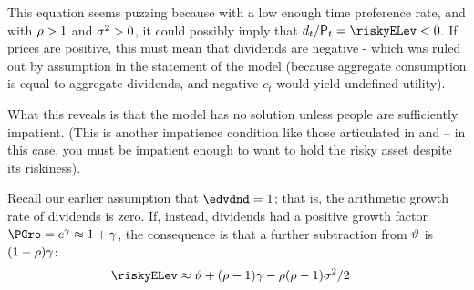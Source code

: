 \documentclass{\handout}
\begin{document}
  This equation seems puzzing because with a low enough time preference rate, and with $\rho > 1$ and $\sigma^{2} > 0$, it could possibly imply that $\dvdnd_{t}/\Price_{t} = \riskyELev < 0$.  If prices are positive, this must mean that dividends are negative - which was ruled out by assumption in the statement of the model (because aggregate consumption is equal to aggregate dividends, and negative $c_{t}$ would yield undefined utility).

  What this reveals is that the model has no solution unless people are sufficiently impatient.  (This is another impatience condition like those articulated in  and  -- in this case, you must be impatient enough to want to hold the risky asset despite its riskiness).
  
  Recall our earlier assumption that $\edvdnd=1$; that is, the arithmetic growth rate of dividends is zero.  If, instead, dividends had a positive growth factor $\PGro=e^{\pGro}\approx 1+\pGro$, the consequence is that a further subtraction from $\vartheta$ is $(1-\rho) \gamma$:
  \begin{equation}\begin{gathered}\begin{aligned}
      \riskyELev & \approx \timeRate + (\CRRA-1) \pGro -\CRRA (\CRRA-1)\riskyvar/2
      \end{aligned}\end{gathered}\end{equation}
\end{document}
